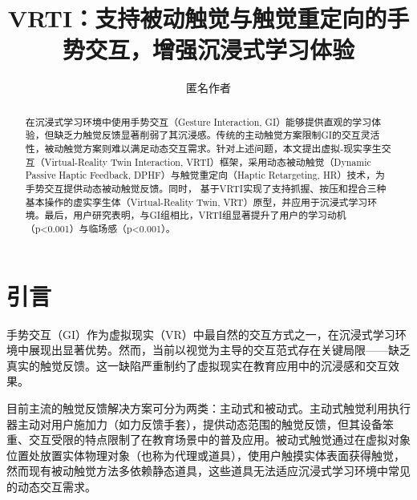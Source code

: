 \documentclass[runningheads]{llncs}
\begin{document}
\title{VRTI：支持被动触觉与触觉重定向的手势交互，增强沉浸式学习体验}

 


\author{匿名作者}

\maketitle

\begin{abstract}
在沉浸式学习环境中使用手势交互（Gesture Interaction, GI）能够提供直观的学习体验，但缺乏力触觉反馈显著削弱了其沉浸感。传统的主动触觉方案限制GI的交互灵活性，被动触觉方案则难以满足动态交互需求。针对上述问题，本文提出虚拟-现实孪生交互（Virtual-Reality Twin Interaction, VRTI）框架，采用动态被动触觉（Dynamic Passive Haptic Feedback, DPHF）与触觉重定向（Haptic Retargeting, HR）技术，为手势交互提供动态被动触觉反馈。同时，
基于VRTI实现了支持抓握、按压和捏合三种基本操作的虚实孪生体（Virtual-Reality Twin, VRT）原型，并应用于沉浸式学习环境。最后，用户研究表明，与GI组相比，VRTI组显著提升了用户的学习动机（p<0.001）与临场感（p<0.001）。

\end{abstract}

\section{引言}
手势交互（GI）作为虚拟现实（VR）中最自然的交互方式之一，在沉浸式学习环境中展现出显著优势\cite{fang2024interactive,amaral2024interactive}。然而，当前以视觉为主导的交互范式存在关键局限——缺乏真实的触觉反馈。这一缺陷严重制约了虚拟现实在教育应用中的沉浸感和交互效果。

目前主流的触觉反馈解决方案可分为两类：主动式和被动式。主动式触觉利用执行器主动对用户施加力（如力反馈手套），提供动态范围的触觉反馈，但其设备笨重、交互受限的特点限制了在教育场景中的普及应用\cite{bonfert2023challenges,shigeyama2019transcalibur}。被动式触觉通过在虚拟对象位置处放置实体物理对象（也称为代理或道具），使用户触摸实体表面获得触觉\cite{hinckley1994passive}，然而现有被动触觉方法多依赖静态道具\cite{strandholt2020knock,fang2023vr,rettinger2023touching}，这些道具无法适应沉浸式学习环境中常见的动态交互需求。
\end{document}
